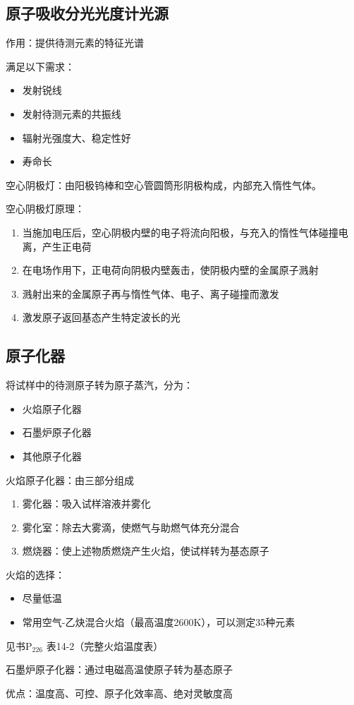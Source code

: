 \subsection{原子吸收分光光度计光源}%
\label{sub:原子吸收分光光度计光源}
\begin{notation}
    作用：提供待测元素的特征光谱
\end{notation}
满足以下需求：
\begin{itemize}
    \item 发射锐线
    \item 发射待测元素的共振线
    \item 辐射光强度大、稳定性好
    \item 寿命长
\end{itemize}
\begin{eg}
    空心阴极灯：由阳极钨棒和空心管圆筒形阴极构成，内部充入惰性气体。
\end{eg}
空心阴极灯原理：
\begin{enumerate}
    \item 当施加电压后，空心阴极内壁的电子将流向阳极，与充入的惰性气体碰撞电离，产生正电荷
    \item 在电场作用下，正电荷向阴极内壁轰击，使阴极内壁的金属原子溅射
    \item 溅射出来的金属原子再与惰性气体、电子、离子碰撞而激发
    \item 激发原子返回基态产生特定波长的光
\end{enumerate}
\subsection{原子化器}%
\label{sub:原子化器}
将试样中的待测原子转为原子蒸汽，分为：
\begin{itemize}
    \item 火焰原子化器
    \item 石墨炉原子化器
    \item 其他原子化器
\end{itemize}
\begin{notation}
    火焰原子化器：由三部分组成
    \begin{enumerate}
        \item 雾化器：吸入试样溶液并雾化
        \item 雾化室：除去大雾滴，使燃气与助燃气体充分混合
        \item 燃烧器：使上述物质燃烧产生火焰，使试样转为基态原子
    \end{enumerate}
\end{notation}
火焰的选择：
\begin{itemize}
    \item 尽量低温
    \item 常用空气-乙炔混合火焰（最高温度2600K），可以测定35种元素
\end{itemize}
见书$\text{P}_{226}$ 表14-2（完整火焰温度表）
\begin{notation}
    石墨炉原子化器：通过电磁高温使原子转为基态原子
\end{notation}
优点：温度高、可控、原子化效率高、绝对灵敏度高

